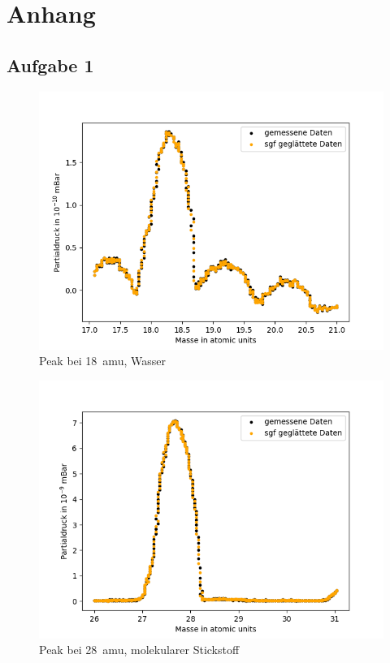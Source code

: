 \chapter{Anhang}
\section{Aufgabe 1}
\begin{figure}[H]
    \centering
    \includegraphics[width=140mm,scale=0.8]{Massenspektrometer/include/MSm18Wasser.png}
    \caption{Peak bei \SI{18}{amu}, Wasser}
    \label{fig:MSWasserPeak}
\end{figure}
\begin{figure}[H]
    \centering
    \includegraphics[width=140mm,scale=0.8]{Massenspektrometer/include/MSm28N2.png}
    \caption{Peak bei \SI{28}{amu}, molekularer Stickstoff}
    \label{fig:MSN2Peak}
\end{figure}
